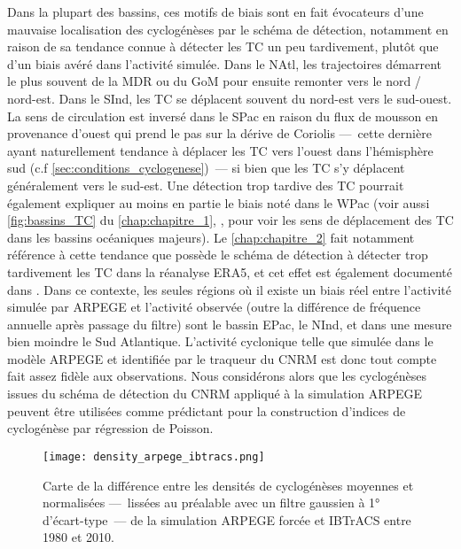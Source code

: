 \documentclass[../main.tex]{subfiles}
\begin{document}
Dans la plupart des bassins, ces motifs de biais sont en fait évocateurs d'une mauvaise localisation des cyclogénèses par le schéma de détection, notamment en
raison de sa tendance connue à détecter les TC un peu tardivement, plutôt que d'un biais avéré dans l'activité simulée. Dans le NAtl, les trajectoires démarrent
le plus souvent de la MDR ou du GoM pour ensuite remonter vers le nord / nord-est. Dans le SInd, les TC se déplacent souvent du nord-est vers le sud-ouest. La
sens de circulation est inversé dans le SPac en raison du flux de mousson en provenance d'ouest qui prend le pas sur la dérive de Coriolis ---~cette dernière
ayant naturellement tendance à déplacer les TC vers l'ouest dans l'hémisphère sud (c.f \cref{sec:conditions_cyclogenese})~--- si bien que les TC s'y déplacent
généralement vers le sud-est. Une détection trop tardive des TC pourrait également expliquer au moins en partie le biais noté dans le WPac (voir aussi
\cref{fig:bassins_TC} du \cref{chap:chapitre_1}, , pour voir les sens de déplacement des TC dans les bassins océaniques majeurs). Le
\cref{chap:chapitre_2} fait notamment référence à cette tendance que possède le schéma de détection à détecter trop tardivement les TC dans la réanalyse ERA5,
et cet effet est également documenté dans \textcite{bourdin_intercomparison_2022}. Dans ce contexte, les seules régions où il existe un biais réel entre
l'activité simulée par ARPEGE et l'activité observée (outre la différence de fréquence annuelle après passage du filtre) sont le bassin EPac, le NInd, et dans
une mesure bien moindre le Sud Atlantique. L'activité cyclonique telle que simulée dans le modèle ARPEGE et identifiée par le traqueur du CNRM est donc tout
compte fait assez fidèle aux observations. Nous considérons alors que les cyclogénèses issues du schéma de détection du CNRM appliqué à la simulation ARPEGE
peuvent être utilisées comme prédictant pour la construction d'indices de cyclogénèse par régression de Poisson.

\begin{figure}[tb]
    \centering
    \texttt{[image: density\_arpege\_ibtracs.png]}
    \caption{Carte de la différence entre les densités de cyclogénèses moyennes et normalisées ---~lissées au préalable avec un filtre gaussien à \ang{1}
    d'écart-type~--- de la simulation ARPEGE forcée et IBTrACS entre \num{1980} et \num{2010}.}
    \label{fig:density_arpege_ibtracs}
\end{figure}
\end{document}
